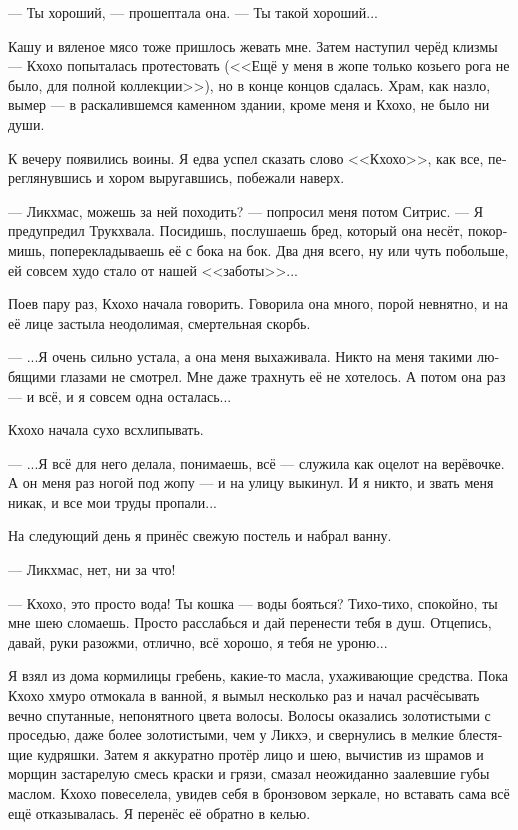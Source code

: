 \documentclass[a4paper,12pt,fleqn]{book}\usepackage{cooltooltips}\usepackage{polyglossia}\setdefaultlanguage[babelshorthands=true]{russian}\setotherlanguage{english}\defaultfontfeatures{Ligatures=TeX,Mapping=tex-text} \usepackage{xcolor}\definecolor{lightgray}{HTML}{bbbbbb}\color{lightgray}\newcommand{\ml}[3]{\textenglish{\textcolor{black}{#3}}}
\begin{document}
{--- Ты хороший, --- прошептала она. --- Ты такой хороший...

Кашу и вяленое мясо тоже пришлось жевать мне.
Затем наступил черёд клизмы --- Кхохо попыталась протестовать (<<Ещё у меня в жопе только козьего рога не было, для полной коллекции>>), но в конце концов сдалась.
Храм, как назло, вымер --- в раскалившемся каменном здании, кроме меня и Кхохо, не было ни души.

К вечеру появились воины.
Я едва успел сказать слово <<Кхохо>>, как все, переглянувшись и хором выругавшись, побежали наверх.

--- Ликхмас, можешь за ней походить? --- попросил меня потом Ситрис.
--- Я предупредил Трукхвала.
Посидишь, послушаешь бред, который она несёт, покормишь, поперекладываешь её с бока на бок.
Два дня всего, ну или чуть побольше, ей совсем худо стало от нашей <<заботы>>...

Поев пару раз, Кхохо начала говорить.
Говорила она много, порой невнятно, и на её лице застыла неодолимая, смертельная скорбь.

---  ...Я очень сильно устала, а она меня выхаживала.
Никто на меня такими любящими глазами не смотрел.
Мне даже трахнуть её не хотелось.
А потом она раз --- и всё, и я совсем одна осталась...

Кхохо начала сухо всхлипывать.

--- ...Я всё для него делала, понимаешь, всё --- служила как оцелот на верёвочке.
А он меня раз ногой под жопу --- и на улицу выкинул.
И я никто, и звать меня никак, и все мои труды пропали...

На следующий день я принёс свежую постель и набрал ванну.

--- Ликхмас, нет, ни за что!

--- Кхохо, это просто вода!
Ты кошка --- воды бояться?
Тихо-тихо, спокойно, ты мне шею сломаешь.
Просто расслабься и дай перенести тебя в душ.
Отцепись, давай, руки разожми, отлично, всё хорошо, я тебя не уроню...

Я взял из дома кормилицы гребень, какие-то масла, ухаживающие средства.
Пока Кхохо хмуро отмокала в ванной, я вымыл несколько раз и начал расчёсывать вечно спутанные, непонятного цвета волосы.
Волосы оказались золотистыми с проседью, даже более золотистыми, чем у Ликхэ, и свернулись в мелкие блестящие кудряшки.
Затем я аккуратно протёр лицо и шею, вычистив из шрамов и морщин застарелую смесь краски и грязи, смазал неожиданно заалевшие губы маслом.
Кхохо повеселела, увидев себя в бронзовом зеркале, но вставать сама всё ещё отказывалась.
Я перенёс её обратно в келью.

}
\end{document}
